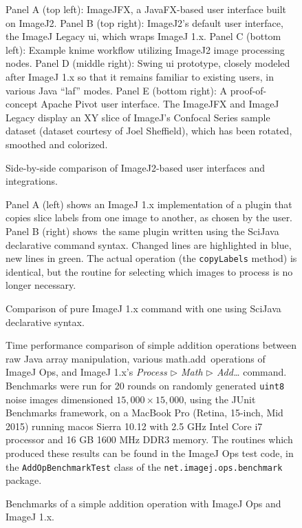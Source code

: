 \documentclass{bmcart}
\begin{document}
\begin{backmatter}
  \begin{figure}[h!]
    \caption{Side-by-side comparison of ImageJ2-based user interfaces
    and integrations.}
    \begin{flushleft}
      Panel A (top left): ImageJFX, a JavaFX-based user interface built on
      ImageJ2. Panel B (top right): ImageJ2's default user interface, the
      ImageJ Legacy \acrshort{ui}, which wraps ImageJ 1.x. Panel C (bottom
      left): Example \acrshort{knime} workflow utilizing ImageJ2 image
      processing nodes. Panel D (middle right): Swing \acrshort{ui} prototype,
      closely modeled after ImageJ 1.x so that it remains familiar to existing
      users, in various Java ``\acrlong{laf}'' modes. Panel E (bottom right): A
      proof-of-concept Apache Pivot user interface. The ImageJFX and ImageJ
      Legacy  display an XY slice of ImageJ's Confocal Series
      sample dataset (dataset courtesy of Joel Sheffield), which has been
      rotated, smoothed and colorized.
    \end{flushleft}
  \end{figure}

  \begin{figure}[h!]
    \caption{Comparison of pure ImageJ 1.x command with one using SciJava
    declarative syntax.}
    \begin{flushleft}
      Panel A (left) shows an ImageJ 1.x implementation of a plugin that copies
      slice labels from one image to another, as chosen by the user. Panel B
      (right) shows~the same plugin written using the SciJava declarative
      command syntax. Changed lines are highlighted in blue, new lines in
      green. The actual operation (the \texttt{copyLabels} method) is
      identical, but the routine for selecting which images to process is no
      longer necessary.
    \end{flushleft}
  \end{figure}

  \begin{figure}[h!]
    \caption{Benchmarks of a simple addition operation with ImageJ Ops and
    ImageJ 1.x.}
    \begin{flushleft}
      Time performance comparison of simple addition operations between raw
      Java array manipulation, various math.add~operations of ImageJ Ops, and
      ImageJ 1.x's \textit{Process $\triangleright$ Math $\triangleright$
      Add\ldots} command. Benchmarks were run for 20 rounds on randomly
      generated \texttt{uint8} noise images dimensioned $15,000 \times 15,000$,
      using the JUnit Benchmarks framework, on a MacBook Pro (Retina, 15-inch,
      Mid 2015) running \acrshort{macos} Sierra 10.12 with 2.5 GHz Intel Core
      i7 processor and 16 GB 1600 MHz DDR3 memory. The routines which produced
      these results can be found in the ImageJ Ops test code, in the
      \texttt{AddOpBenchmarkTest} class of the
      \texttt{net.imagej.ops.benchmark} package.
    \end{flushleft}
  \end{figure}


\end{backmatter}
\end{document}
